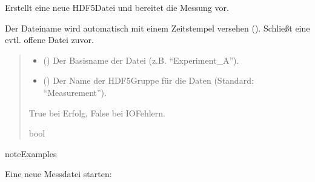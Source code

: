 \documentclass[letterpaper,10pt,english]{sphinxmanual}
\begin{document}
\begin{fulllineitems}
\begin{fulllineitems}
\label{\detokenize{modulab/export_manager:modules.export.ExportManager.ExportManager.new}}
\pysigstartsignatures
\pysiglinewithargsret
{}
{\sphinxparamcomma {}}
{}
\pysigstopsignatures
\sphinxAtStartPar
Erstellt eine neue HDF5\sphinxhyphen{}Datei und bereitet die Messung vor.

\sphinxAtStartPar
Der Dateiname wird automatisch mit einem Zeitstempel versehen
(). Schließt eine evtl. offene Datei zuvor.
\begin{quote}\begin{description}
\begin{itemize}
\item {} 
\sphinxAtStartPar
{} () \textendash{} Der Basisname der Datei (z.B. “Experiment\_A”).

\item {} 
\sphinxAtStartPar
{} () \textendash{} Der Name der HDF5\sphinxhyphen{}Gruppe für die Daten
(Standard: “Measurement”).

\end{itemize}

\sphinxAtStartPar
True bei Erfolg, False bei IO\sphinxhyphen{}Fehlern.

\sphinxAtStartPar
bool

\end{description}\end{quote}

\begin{sphinxadmonition}{note}{Examples}

\sphinxAtStartPar
Eine neue Messdatei starten:

\begin{sphinxVerbatim}[commandchars=\\\{\}]
 
\end{sphinxVerbatim}
\end{sphinxadmonition}


\end{fulllineitems}
\end{fulllineitems}
\end{document}
